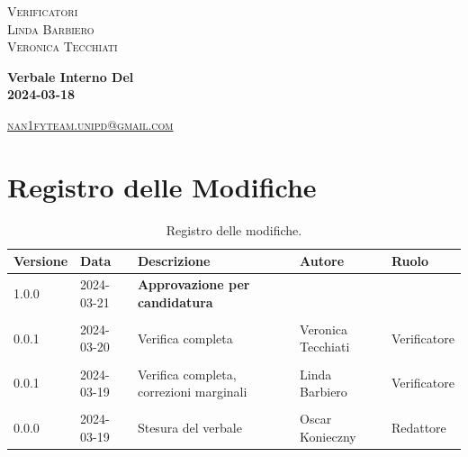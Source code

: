\documentclass[8pt]{article}
\begin{document}
\begin{titlepage}
\begin{minipage}[t]{0.47\textwidth}
		{\large{\textsc{Verificatori}}
			\vspace{3mm}
			{\\\large{\textsc{Linda Barbiero}\\}} %
			{\large{\textsc{Veronica Tecchiati}}}
			
		}
		\vspace{4mm}\vspace{4mm}
	\end{minipage}
	\vspace{4cm}
	\begin{center}
		\begin{flushright}
			{\fontsize{30pt}{52pt}\selectfont \textbf{Verbale Interno Del\\2024-03-18\\}} %
		\end{flushright}
		\vspace{3cm}
	\end{center}
	\vspace{8.5 cm}
	{\small \textsc{\href{mailto: nan1fyteam.unipd@gmail.com}{nan1fyteam.unipd@gmail.com}}}
\end{titlepage}
\pagestyle{mystyle}
\section*{Registro delle Modifiche}
\begin{table}[ht!]	
	\centering
	\begin{tabular}{p{1.2cm} p{2cm} p{6cm} p{3cm} p{2cm}}
		\toprule
		\textbf{Versione}& \textbf{Data} & \textbf{Descrizione} & \textbf{Autore} & \textbf{Ruolo} \\
		\midrule
		1.0.0 & 2024-03-21 & \textbf{Approvazione per candidatura} & & \\\\
		0.0.1 & 2024-03-20 & Verifica completa & Veronica Tecchiati & Verificatore \\\\
		0.0.1 & 2024-03-19 & Verifica completa, correzioni marginali & Linda Barbiero & Verificatore \\\\
		0.0.0 & 2024-03-19 & Stesura del verbale & Oscar Konieczny & Redattore \\
		\bottomrule
	\end{tabular}
	\caption{Registro delle modifiche.}
	\label{table:Registro delle modifiche}
\end{table}
\newpage
\tableofcontents
\clearpage
\newpage
\justifying
\end{document}
